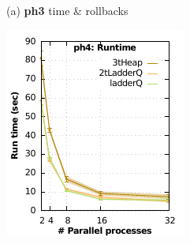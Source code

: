 \begin{figure}
\begin{minipage}{0.32\linewidth}
\begin{minipage}{0.49\linewidth}
\end{minipage}
\centerline{(a) \textbf{ph3} time \& rollbacks}
\end{minipage}
\begin{minipage}{0.32\linewidth}
\begin{minipage}{0.49\linewidth}
\includegraphics[width=\linewidth]{images/ph4_Delay_1_Evt_2_run_time}
\end{minipage}
\begin{minipage}{0.49\linewidth}

\end{minipage}
\end{minipage}
\end{figure}
